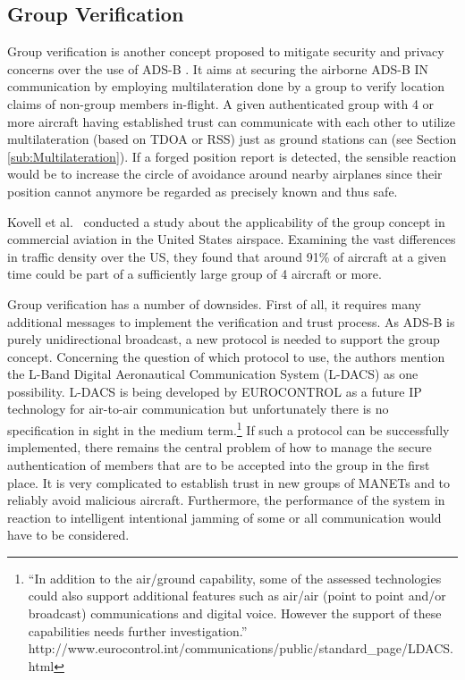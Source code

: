 \documentclass[english]{IEEEtran}
\begin{document}
\subsection{Group Verification}

Group verification is another concept proposed to mitigate security
and privacy concerns over the use of ADS-B \cite{Sampigethaya2011}.
It aims at securing the airborne ADS-B IN communication by employing
multilateration done by a group to verify location claims of non-group
members in-flight. A given authenticated group with 4 or more aircraft
having established trust can communicate with each other to utilize
multilateration (based on TDOA or RSS) just as ground stations can
(see Section \ref{sub:Multilateration}). If a forged position report
is detected, the sensible reaction would be to increase the circle
of avoidance around nearby airplanes since their position cannot anymore
be regarded as precisely known and thus safe.

Kovell et al.~\cite{Kovell2012} conducted a study about the applicability
of the group concept in commercial aviation in the United States airspace.
Examining the vast differences in traffic density over the US, they
found that around 91\% of aircraft at a given time could be part of
a sufficiently large group of 4 aircraft or more.

Group verification has a number of downsides. First of all, it requires
many additional messages to implement the verification and trust process.
As ADS-B is purely unidirectional broadcast, a new protocol is needed
to support the group concept. Concerning the question of which protocol
to use, the authors mention the L-Band Digital Aeronautical Communication
System (L-DACS) as one possibility. L-DACS is being developed by EUROCONTROL
as a future IP technology for air-to-air communication but unfortunately
there is no specification in sight in the medium term.\footnote{``In addition to the air/ground capability, some of the assessed
technologies could also support additional features such as air/air
(point to point and/or broadcast) communications and digital voice.
However the support of these capabilities needs further investigation.''
http://www.eurocontrol.int/communications/public/standard\_page/LDACS.html} If such a protocol can be successfully implemented, there remains
the central problem of how to manage the secure authentication of
members that are to be accepted into the group in the first place.
It is very complicated to establish trust in new groups of MANETs
and to reliably avoid malicious aircraft. Furthermore, the performance
of the system in reaction to intelligent intentional jamming of some
or all communication would have to be considered.
\end{document}
